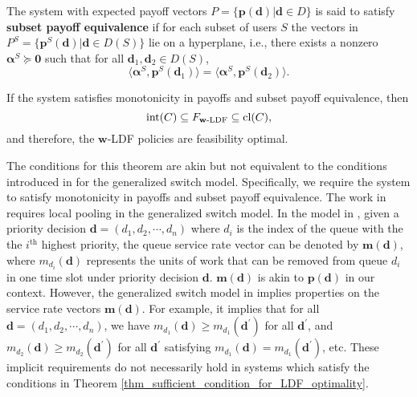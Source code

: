 \documentclass[prodmode,acmtompecs]{acmsmall}
\newcommand{\feasibilityRegion}{F}
\newcommand{\myComments}[1]{}
\newif\ifextended
\newcommand{\extendedStart}{\ifextended  \myComments{Extended version: }}
\newcommand{\commentEnd}{\myComments{End}}
\begin{document}
\begin{definition}
\label{defn_subset_payoff_equivalence}
The system with expected payoff vectors $P = \{\mathbf{p}(\mathbf{d}) | \mathbf{d} \in D \}$ is said to satisfy {\bf subset payoff equivalence} if for each subset of users $S$ the vectors in $P^S = \{\mathbf{p}^S(\mathbf{d}) | \mathbf{d} \in D(S)\}$ lie on a hyperplane, i.e., there exists a nonzero $\boldsymbol{\alpha}^S \succeq \mathbf{0}$ such that for all $\mathbf{d}_1, \mathbf{d}_2 \in D(S)$, 
$$
\langle \boldsymbol{\alpha}^S, \mathbf{p}^S(\mathbf{d}_1) \rangle = \langle \boldsymbol{\alpha}^S, \mathbf{p}^S(\mathbf{d}_2) \rangle. 
$$
\end{definition}

\begin{theorem}
\label{thm_sufficient_condition_for_LDF_optimality}
If the system satisfies monotonicity in payoffs and subset payoff equivalence, then 
$$
\textnormal{int}(C) \subseteq \feasibilityRegion_{\mathbf{w}\textnormal{-LDF}} \subseteq \textnormal{cl}(C), 
$$
and therefore, the $\mathbf{w}$-LDF policies are feasibility optimal. 
\end{theorem}
\extendedStart
\noindent Please refer to Appendix \ref{appendix_pf_thm_sufficient_condition_for_LDF_optimality} for detailed proof. 
\commentEnd\fi

The conditions for this theorem are akin but not equivalent to the conditions introduced in \cite{DiW06} for the generalized switch model. 
Specifically, we require the system to satisfy monotonicity in payoffs and subset payoff equivalence. The work in \cite{DiW06} requires local pooling in the generalized switch model. 
In the model in \cite{DiW06}, given a priority decision $\mathbf{d} = (d_1, d_2, \cdots, d_n)$ where $d_i$ is the index of the queue with the the $i^\text{th}$ highest priority, the queue service rate vector can be denoted by $\mathbf{m}(\mathbf{d})$, where $m_{d_i}(\mathbf{d})$ represents the units of work that can be removed from queue $d_i$ in one time slot under priority decision $\mathbf{d}$. $\mathbf{m}(\mathbf{d})$ is akin to $\mathbf{p}(\mathbf{d})$ in our context. However, the generalized switch model in \cite{DiW06} implies properties on the service rate vectors $\mathbf{m}(\mathbf{d})$. For example, it implies that for all $\mathbf{d} = (d_1, d_2, \cdots, d_n)$, we have $m_{d_1}(\mathbf{d}) \geq m_{d_1}(\mathbf{d}^\prime)$ for all $\mathbf{d}^\prime$, and $m_{d_2}(\mathbf{d}) \geq m_{d_2}(\mathbf{d}^\prime)$ for all $\mathbf{d}^\prime$ satisfying $m_{d_1}(\mathbf{d}) = m_{d_1}(\mathbf{d}^\prime)$, etc. These implicit requirements do not necessarily hold in systems which satisfy the conditions in Theorem \ref{thm_sufficient_condition_for_LDF_optimality}. 
\end{document}
